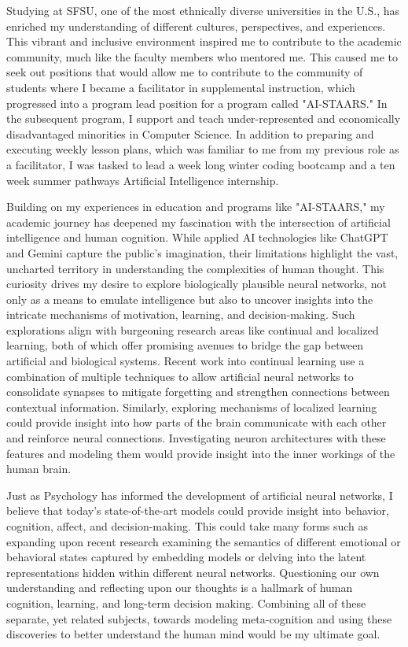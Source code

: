 \documentclass[10pt]{article}
\begin{document}
Studying at SFSU, one of the most ethnically diverse universities in the U.S., has enriched my understanding of different cultures,
perspectives, and experiences. This vibrant and inclusive environment inspired me to contribute to the academic community, much like the
faculty members who mentored me. This caused me to seek out positions that would allow me to contribute to the community of students where
I became a facilitator in supplemental instruction, which progressed into a program lead position for a program called "AI-STAARS." In the
subsequent program, I support and teach under-represented and economically disadvantaged minorities in Computer Science.  In addition to
preparing and executing weekly lesson plans, which was familiar to me from my previous role as a facilitator, I was tasked to lead a week
long winter coding bootcamp and a ten week summer pathways Artificial Intelligence internship.

Building on my experiences in education and programs like "AI-STAARS," my academic journey has deepened my fascination with the
intersection of artificial intelligence and human cognition. While applied AI technologies like ChatGPT and Gemini capture the public's
imagination, their limitations highlight the vast, uncharted territory in understanding the complexities of human thought. This curiosity
drives my desire to explore biologically plausible neural networks, not only as a means to emulate intelligence but also to uncover
insights into the intricate mechanisms of motivation, learning, and decision-making. Such explorations align with burgeoning research areas
like continual and localized learning, both of which offer promising avenues to bridge the gap between artificial and biological systems.
Recent work into continual learning use a combination of multiple techniques to allow artificial neural networks to consolidate synapses to
mitigate forgetting and strengthen connections between contextual information. Similarly, exploring mechanisms of localized learning could
provide insight into how parts of the brain communicate with each other and reinforce neural connections. Investigating neuron
architectures with these features and modeling them would provide insight into the inner workings of the human brain.

Just as Psychology has informed the development of artificial neural networks, I believe that today's state-of-the-art models could provide
insight into behavior, cognition, affect, and decision-making. This could take many forms such as expanding upon recent research examining
the semantics of different emotional or behavioral states captured by embedding models or delving into the latent representations hidden
within different neural networks. Questioning our own understanding and reflecting upon our thoughts is a hallmark of human cognition,
learning, and long-term decision making. Combining all of these separate, yet related subjects, towards modeling meta-cognition and using
these discoveries to better understand the human mind would be my ultimate goal.
\end{document}
